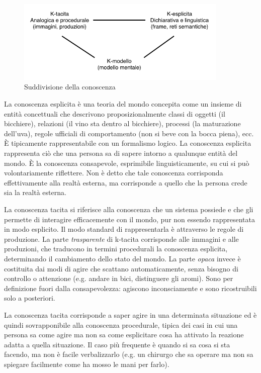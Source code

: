 \begin{figure}[hbt]
  \centering
  \includegraphics[width=0.9\textwidth]{img/k-conoscenza.png}
  \caption{Suddivisione della conoscenza}
  \label{fig:kconoscenza}
\end{figure}

La conoscenza esplicita è una teoria del mondo concepita come un insieme di entità concettuali che descrivono proposizionalmente classi di oggetti (il bicchiere), relazioni (il vino sta dentro al bicchiere), processi (la maturazione dell’uva), regole ufficiali di comportamento (non si beve con la bocca piena), ecc. È tipicamente rappresentabile con un formalismo logico. La conoscenza esplicita rappresenta ciò che una persona sa di sapere intorno a qualunque entità del mondo. È la conoscenza consapevole, esprimibile linguisticamente, su cui si può volontariamente riflettere. Non è detto che tale conoscenza corrisponda effettivamente alla realtà esterna, ma corrisponde a quello che la persona crede sia la realtà esterna.

La conoscenza tacita si riferisce alla conoscenza che un sistema possiede e che gli permette di interagire efficacemente con il mondo, pur non essendo rappresentata in modo esplicito. Il modo standard di rappresentarla è attraverso le regole di produzione. La parte \emph{trasparente} di k-tacita corrisponde alle immagini e alle produzioni, che traducono in termini procedurali la conoscenza esplicita, determinando il cambiamento dello stato del mondo. La parte \emph{opaca} invece è costituita dai modi di agire che scattano automaticamente, senza bisogno di controllo o attenzione (e.g. andare in bici, distinguere gli aromi). Sono per definizione fuori dalla consapevolezza: agiscono inconsciamente e sono ricostruibili solo a posteriori.

La conoscenza tacita corrisponde a saper agire in una determinata situazione ed è quindi sovrapponibile alla conoscenza procedurale, tipica dei casi in cui una persona sa come agire ma non sa come esplicitare cosa ha attivato la reazione adatta a quella situazione. Il caso più frequente è quando si sa cosa si sta facendo, ma non è facile verbalizzarlo (e.g. un chirurgo che sa operare ma non sa spiegare facilmente come ha mosso le mani per farlo).

